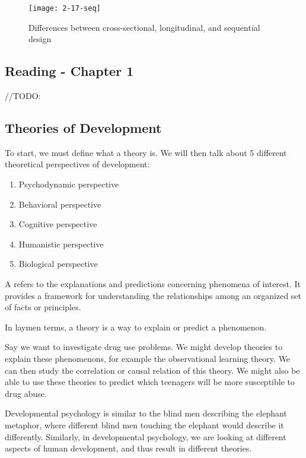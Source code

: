 \documentclass[../main/main.tex]{subfiles}
\begin{document}
\begin{figure}[htpb]
  \centering
  \texttt{[image: 2-17-seq]}
  \caption{Differences between cross-sectional, longitudinal, and sequential design}
\end{figure}

\subsection{Reading - Chapter 1}
//TODO:

\subsection{Theories of Development}
To start, we must define what a theory is. We will then talk about 5 different theoretical perspectives of development:
\begin{enumerate}
\item Psychodynamic perspective
\item Behavioral perspective
\item Cognitive perspective
\item Humanistic perspective
\item Biological perspective
\end{enumerate}

\begin{definition}
A  refers to the explanations and predictions concerning phenomena of interest. It provides a framework for understanding the relationships among an organized set of facts or principles. 
\end{definition}
\begin{remark}
In laymen terms, a theory is a way to explain or predict a phenomenon.
\end{remark}
\begin{example}
Say we want to investigate drug use problems. We might develop theories to explain these phenomenons, for example the observational learning theory. We can then study the correlation or causal relation of this theory. We might also be able to use these theories to predict which teenagers will be more susceptible to drug abuse.
\end{example}

Developmental psychology is similar to the blind men describing the elephant metaphor, where different blind men touching the elephant would describe it differently. Similarly, in developmental psychology, we are looking at different aspects of human development, and thus result in different theories.
\end{document}
